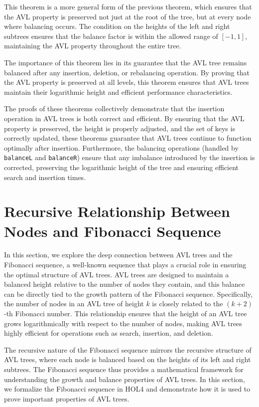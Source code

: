 \documentclass[12pt]{article}
\begin{document}
\begin{itemize}
  This theorem is a more general form of the previous theorem, which ensures that the AVL property is preserved not just at the root of the tree, but at every node where balancing occurs. The condition on the heights of the left and right subtrees ensures that the balance factor is within the allowed range of \([-1, 1]\), maintaining the AVL property throughout the entire tree.

  The importance of this theorem lies in its guarantee that the AVL tree remains balanced after any insertion, deletion, or rebalancing operation. By proving that the AVL property is preserved at all levels, this theorem ensures that AVL trees maintain their logarithmic height and efficient performance characteristics.

\end{itemize}

The proofs of these theorems collectively demonstrate that the insertion operation in AVL trees is both correct and efficient. By ensuring that the AVL property is preserved, the height is properly adjusted, and the set of keys is correctly updated, these theorems guarantee that AVL trees continue to function optimally after insertion. Furthermore, the balancing operations (handled by \texttt{balanceL} and \texttt{balanceR}) ensure that any imbalance introduced by the insertion is corrected, preserving the logarithmic height of the tree and ensuring efficient search and insertion times.



\section{Recursive Relationship Between Nodes and Fibonacci Sequence}

In this section, we explore the deep connection between AVL trees and the Fibonacci sequence, a well-known sequence that plays a crucial role in ensuring the optimal structure of AVL trees. AVL trees are designed to maintain a balanced height relative to the number of nodes they contain, and this balance can be directly tied to the growth pattern of the Fibonacci sequence. Specifically, the number of nodes in an AVL tree of height \( k \) is closely related to the \( (k+2) \)-th Fibonacci number. This relationship ensures that the height of an AVL tree grows logarithmically with respect to the number of nodes, making AVL trees highly efficient for operations such as search, insertion, and deletion.

The recursive nature of the Fibonacci sequence mirrors the recursive structure of AVL trees, where each node is balanced based on the heights of its left and right subtrees. The Fibonacci sequence thus provides a mathematical framework for understanding the growth and balance properties of AVL trees. In this section, we formalize the Fibonacci sequence in HOL4 and demonstrate how it is used to prove important properties of AVL trees.
\end{document}
